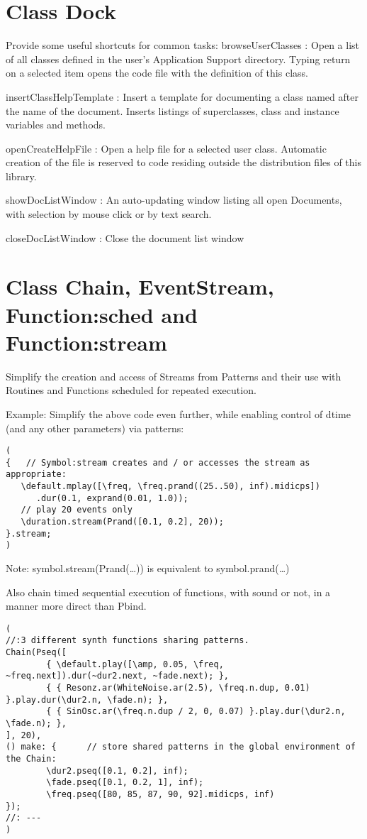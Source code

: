 \documentclass[11pt, a4paper]{scrartcl}
\begin{document}
\section*{Class Dock}
\label{sec-12}


Provide some useful shortcuts for common tasks: 
   browseUserClasses :    Open a list of all classes defined in the user's Application Support 
      directory. Typing return on a selected item opens the code file with the definition of this class. 

   insertClassHelpTemplate : Insert a template for documenting a class named after the name of the
      document. Inserts listings of superclasses, class and instance variables and methods. 

   openCreateHelpFile : Open a help file for a selected user class. Automatic creation of the file 
         is reserved to code residing outside the distribution files of this library. 

   showDocListWindow :  An auto-updating window listing all open Documents, with selection by mouse click
               or by text search.

   closeDocListWindow : Close the document list window
\section*{Class Chain, EventStream, Function:sched and Function:stream}
\label{sec-13}


Simplify the creation and access of Streams from Patterns and their use with Routines and Functions scheduled for repeated execution.  

Example: Simplify the above code even further, while enabling  control of dtime (and any other parameters) via patterns:

\begin{verbatim}
(
{   // Symbol:stream creates and / or accesses the stream as appropriate: 
   \default.mplay([\freq, \freq.prand((25..50), inf).midicps])
      .dur(0.1, exprand(0.01, 1.0));
   // play 20 events only
   \duration.stream(Prand([0.1, 0.2], 20)); 
}.stream;    
)
\end{verbatim}

Note: symbol.stream(Prand(\ldots{})) is equivalent to symbol.prand(\ldots{})

Also chain timed sequential execution of functions, with sound or not, in a manner more direct than Pbind.

\begin{verbatim}
(
//:3 different synth functions sharing patterns. 
Chain(Pseq([
        { \default.play([\amp, 0.05, \freq, ~freq.next]).dur(~dur2.next, ~fade.next); },
        { { Resonz.ar(WhiteNoise.ar(2.5), \freq.n.dup, 0.01) }.play.dur(\dur2.n, \fade.n); },
        { { SinOsc.ar(\freq.n.dup / 2, 0, 0.07) }.play.dur(\dur2.n, \fade.n); },
], 20), 
() make: {      // store shared patterns in the global environment of the Chain:
        \dur2.pseq([0.1, 0.2], inf);
        \fade.pseq([0.1, 0.2, 1], inf); 
        \freq.pseq([80, 85, 87, 90, 92].midicps, inf) 
});
//: ---
)
\end{verbatim}
\end{document}
